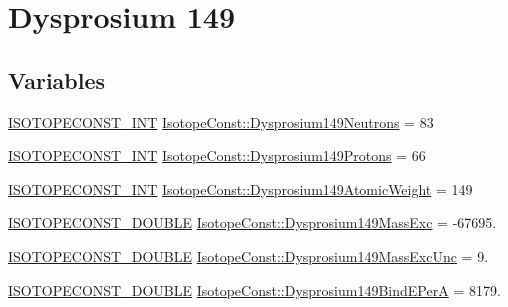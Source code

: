 \hypertarget{group___isotope_const-_dysprosium-_dy149}{}\section{Dysprosium 149}
\label{group___isotope_const-_dysprosium-_dy149}
\subsection*{Variables}
\begin{DoxyCompactItemize}
\item 
\mbox{\hyperlink{group___isotope_const-_macros_ga5f18360b3e99483a35c32d789e62621c}{I\+S\+O\+T\+O\+P\+E\+C\+O\+N\+S\+T\+\_\+\+I\+NT}} \mbox{\hyperlink{group___isotope_const-_dysprosium-_dy149_ga02dd388369cdf8f9f0492ce259b15af9}{Isotope\+Const\+::\+Dysprosium149\+Neutrons}} = 83
\item 
\mbox{\hyperlink{group___isotope_const-_macros_ga5f18360b3e99483a35c32d789e62621c}{I\+S\+O\+T\+O\+P\+E\+C\+O\+N\+S\+T\+\_\+\+I\+NT}} \mbox{\hyperlink{group___isotope_const-_dysprosium-_dy149_gaf5c8e9b77e05ec4b90d06f9c7c3c0811}{Isotope\+Const\+::\+Dysprosium149\+Protons}} = 66
\item 
\mbox{\hyperlink{group___isotope_const-_macros_ga5f18360b3e99483a35c32d789e62621c}{I\+S\+O\+T\+O\+P\+E\+C\+O\+N\+S\+T\+\_\+\+I\+NT}} \mbox{\hyperlink{group___isotope_const-_dysprosium-_dy149_gaf522e7dfb2b2afcc7cdebfde2c945920}{Isotope\+Const\+::\+Dysprosium149\+Atomic\+Weight}} = 149
\item 
\mbox{\hyperlink{group___isotope_const-_macros_ga8f45a7272ce02c0b4c65c44636ed719a}{I\+S\+O\+T\+O\+P\+E\+C\+O\+N\+S\+T\+\_\+\+D\+O\+U\+B\+LE}} \mbox{\hyperlink{group___isotope_const-_dysprosium-_dy149_ga21e04d64efbff95585c06367f9c4878e}{Isotope\+Const\+::\+Dysprosium149\+Mass\+Exc}} = -\/67695.
\item 
\mbox{\hyperlink{group___isotope_const-_macros_ga8f45a7272ce02c0b4c65c44636ed719a}{I\+S\+O\+T\+O\+P\+E\+C\+O\+N\+S\+T\+\_\+\+D\+O\+U\+B\+LE}} \mbox{\hyperlink{group___isotope_const-_dysprosium-_dy149_ga9831bafc9f423e450a27ce45b196e791}{Isotope\+Const\+::\+Dysprosium149\+Mass\+Exc\+Unc}} = 9.
\item 
\mbox{\hyperlink{group___isotope_const-_macros_ga8f45a7272ce02c0b4c65c44636ed719a}{I\+S\+O\+T\+O\+P\+E\+C\+O\+N\+S\+T\+\_\+\+D\+O\+U\+B\+LE}} \mbox{\hyperlink{group___isotope_const-_dysprosium-_dy149_gaa404923dd9c253fe9019c74e508f9d2f}{Isotope\+Const\+::\+Dysprosium149\+Bind\+E\+PerA}} = 8179.

\end{DoxyCompactItemize}
